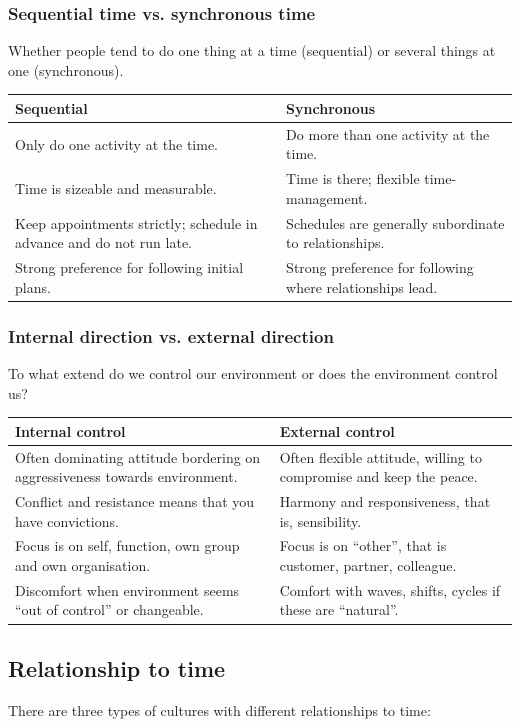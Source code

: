 \subsubsection{Sequential time vs. synchronous time}
Whether people tend to do one thing at a time (sequential) or several things at one (synchronous).

\begin{tabularx}{\textwidth}{X|X}
	Sequential & Synchronous \\ 
	\hline 
	Only do one activity at the time. & Do more than one activity at the time. \\
	Time is sizeable and measurable. & Time is there; flexible time-management. \\ 
	Keep appointments strictly; schedule in advance and do not run late. & Schedules are generally subordinate to relationships. \\
	Strong preference for following initial plans. & Strong preference for following where relationships lead. \\
\end{tabularx}

\subsubsection{Internal direction vs. external direction}
To what extend do we control our environment or does the environment control us?

\begin{tabularx}{\textwidth}{X|X}
	Internal control & External control \\ 
	\hline 
	Often dominating attitude bordering on aggressiveness towards environment. & Often flexible attitude, willing to compromise and keep the peace. \\
	Conflict and resistance means that you have	convictions. & Harmony and responsiveness, that is, sensibility. \\ 
	Focus is on self, function, own group and own organisation. & Focus is on “other”, that is customer, partner, colleague. \\
	Discomfort when environment seems “out of control” or changeable. & Comfort with waves, shifts, cycles if these are “natural”. \\
\end{tabularx}

\subsection{Relationship to time}
There are three types of cultures with different relationships to time:

